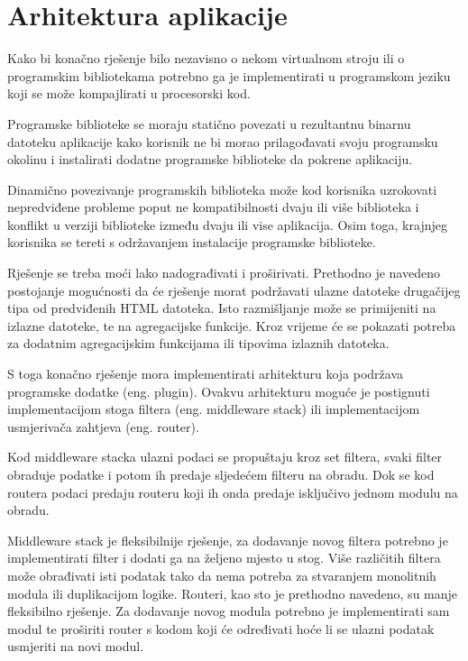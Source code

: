 \documentclass[times, utf8, zavrsni]{fer}
\begin{document}
\section{Arhitektura aplikacije}

Kako bi konačno rješenje bilo nezavisno o nekom virtualnom stroju ili o
programskim bibliotekama potrebno ga je implementirati u programskom jeziku
koji se može kompajlirati u procesorski kod.

Programske biblioteke se moraju statično povezati u rezultantnu binarnu
datoteku aplikacije kako korisnik ne bi morao prilagođavati svoju programsku
okolinu i instalirati dodatne programske biblioteke da pokrene aplikaciju.

Dinamično povezivanje programskih biblioteka može kod korisnika uzrokovati
nepredviđene probleme poput ne kompatibilnosti dvaju ili više biblioteka i
konflikt u verziji biblioteke između dvaju ili vise aplikacija. Osim toga,
krajnjeg korisnika se tereti s održavanjem instalacije programske biblioteke.

Rješenje se treba moći lako nadograđivati i proširivati. Prethodno je navedeno
postojanje mogućnosti da će rješenje morat podržavati ulazne datoteke
drugačijeg tipa od predviđenih HTML datoteka. Isto razmišljanje može se
primijeniti na izlazne datoteke, te na agregacijske funkcije. Kroz vrijeme će
se pokazati potreba za dodatnim agregacijskim funkcijama ili tipovima izlaznih
datoteka.

S toga konačno rješenje mora implementirati arhitekturu koja
podržava programske dodatke \cite{plugin_architecture_wiki}
(eng. plugin). Ovakvu arhitekturu moguće je
postignuti implementacijom stoga filtera \cite{middleware_wiki}
(eng. middleware stack) ili
implementacijom usmjerivača zahtjeva \cite{router_arhitecture_ieee}
(eng. router).

Kod middleware stacka ulazni podaci se propuštaju kroz set filtera, svaki filter
obraduje podatke i potom ih predaje sljedećem filteru na obradu. Dok se kod
routera podaci predaju routeru koji ih onda predaje isključivo jednom modulu na
obradu.

Middleware stack je fleksibilnije rješenje, za dodavanje novog filtera potrebno
je implementirati filter i dodati ga na željeno mjesto u stog. Više različitih
filtera može obrađivati isti podatak tako da nema potreba za stvaranjem
monolitnih modula ili duplikacijom logike. Routeri, kao sto je prethodno
navedeno, su manje fleksibilno rješenje. Za dodavanje novog modula potrebno je
implementirati sam modul te proširiti router s kodom koji će određivati hoće li
se ulazni podatak usmjeriti na novi modul.
\end{document}
